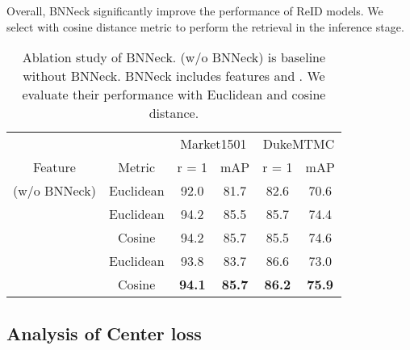 \documentclass[journal]{IEEEtran}
\begin{document}
Overall, BNNeck significantly improve the performance of ReID models.
We select  with cosine distance metric to perform the retrieval in the inference stage.

\renewcommand{\multirowsetup}{\centering}
\begin{table}[tb]\small
  \begin{center}
  \begin{tabular}{ c|c|cc|cc}
\hline
    		&		       & \multicolumn{2}{c|}{Market1501} & \multicolumn{2}{c}{DukeMTMC}	 \\
  Feature   & Metric	   & r = 1 	& mAP	&r = 1 	& mAP 	 \\
 	\hline
	\hline
     (w/o BNNeck) & Euclidean    &92.0	&81.7	&82.6	&70.6 \\
       & Euclidean             &94.2	&85.5	&85.7	&74.4		\\
       & Cosine                &94.2	&85.7	&85.5	&74.6		\\
       & Euclidean	            &93.8	&83.7	&86.6	&73.0       \\
       & Cosine                &\textbf{94.1}	&\textbf{85.7}	&\textbf{86.2}	&\textbf{75.9}		\\
\hline
  \end{tabular}
  \end{center}
  \caption{\label{tab:bnneck}Ablation study of BNNeck.  (w/o BNNeck) is baseline without BNNeck. BNNeck includes features  and . We evaluate their performance with Euclidean and cosine distance.}
\end{table}

\subsection{Analysis of Center loss}
\end{document}
